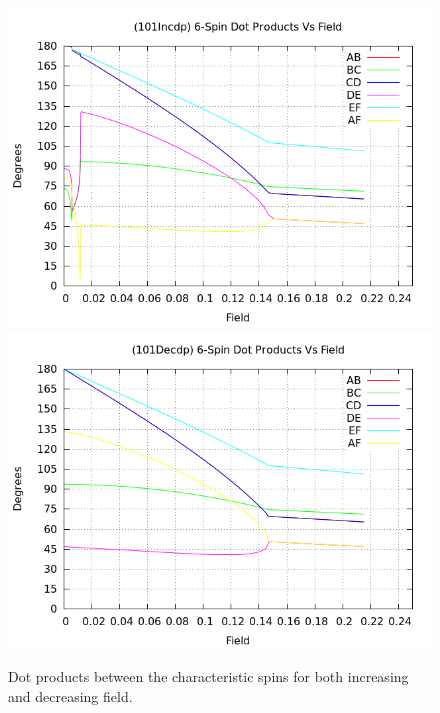 \documentclass{article}
\begin{document}
\begin{center}
\begin{figure}
\centering
\includegraphics[scale=0.5]{HVariedData/Pictures/101Incdp.png}
\includegraphics[scale=0.5]{HVariedData/Pictures/101Decdp.png}
\caption{Dot products between the characteristic spins for both increasing and decreasing field.}
\end{figure}
\end{center}
\clearpage

\pagebreak
\end{document}
